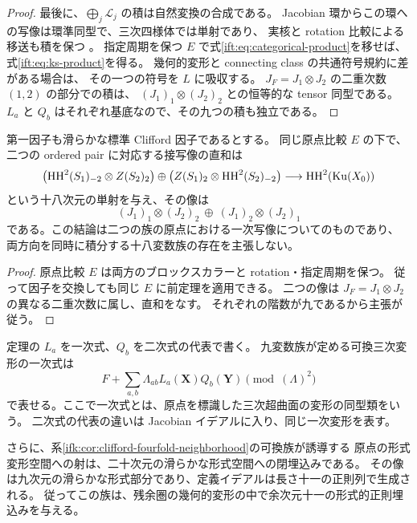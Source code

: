 \begin{proof}
最後に、$\bigoplus_j\mathcal L_j$ の積は自然変換の合成である。
Jacobian 環からこの環への写像は環準同型で、三次四様体では単射であり、
実核と rotation 比較による移送も積を保つ
\cite[Propositions~3.3, 3.5 and~3.9]{NFHuybrechtsRennemo}。
指定周期を保つ $E$ で式\eqref{ift:eq:categorical-product}を移せば、
式\eqref{ift:eq:ks-product}を得る。
幾何的変形と connecting class の共通符号規約に差がある場合は、
その一つの符号を $L$ に吸収する。
$J_F=J_1\otimes J_2$ の二重次数 $(1,2)$ の部分での積は、
$(J_1)_1\otimes(J_2)_2$ との恒等的な tensor 同型である。
$L_a$ と $Q_b$ はそれぞれ基底なので、その九つの積も独立である。
\end{proof}

\begin{corollary}
\label{ift:cor:two-clifford-tangents}
第一因子も滑らかな標準 Clifford 因子であるとする。
同じ原点比較 $E$ の下で、二つの ordered pair に対応する接写像の直和は
\[
 \bigl(\mathrm{HH}^2(S_1)_{-2}\otimes Z(S_2)_2\bigr)
 \oplus
 \bigl(Z(S_1)_2\otimes\mathrm{HH}^2(S_2)_{-2}\bigr)
 \longrightarrow\mathrm{HH}^2(\operatorname{Ku}(X_0))
\]
という十八次元の単射を与え、その像は
\[
     (J_1)_1\otimes(J_2)_2
       \ \oplus\ (J_1)_2\otimes(J_2)_1
\]
である。この結論は二つの族の原点における一次写像についてのものであり、
両方向を同時に積分する十八変数族の存在を主張しない。
\end{corollary}

\begin{proof}
原点比較 $E$ は両方のブロックスカラーと rotation・指定周期を保つ。
従って因子を交換しても同じ $E$ に前定理を適用できる。
二つの像は $J_F=J_1\otimes J_2$ の異なる二重次数に属し、直和をなす。
それぞれの階数が九であるから主張が従う。
\end{proof}

\begin{corollary}[可換三次の一次式と形式的な九次元部分]
\label{ift:cor:first-jet}
定理の $L_a$ を一次式、$Q_b$ を二次式の代表で書く。
九変数族が定める可換三次変形の一次式は
\begin{equation}\label{ift:eq:first-jet}
            F+\sum_{a,b}\Lambda_{ab}L_a(\mathbf X)Q_b(\mathbf Y)
                \pmod{(\Lambda)^2}
\end{equation}
で表せる。ここで一次式とは、原点を標識した三次超曲面の変形の同型類をいう。
二次式の代表の違いは Jacobian イデアルに入り、同じ一次変形を表す。

さらに、系\ref{ifk:cor:clifford-fourfold-neighborhood}の可換族が誘導する
原点の形式変形空間への射は、二十次元の滑らかな形式空間への閉埋込みである。
その像は九次元の滑らかな形式部分であり、定義イデアルは長さ十一の正則列で生成される。
従ってこの族は、残余圏の幾何的変形の中で余次元十一の形式的正則埋込みを与える。
\end{corollary}

